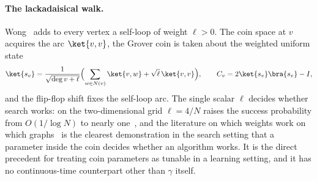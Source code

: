 \paragraph*{The lackadaisical walk.}
\label{sec:lackadaisical}
Wong~\cite{Wong_2015, G_2018} adds to every vertex a self-loop of weight $\ell
> 0$. The coin space at $v$ acquires the arc $\ket{v, v}$, the Grover coin is
taken about the weighted uniform state
\begin{equation}
	\ket{s_v} = \frac{1}{\sqrt{\deg v + \ell}} \Bigl( \sum_{w \in N(v)} \ket{v, w} + \sqrt{\ell}\, \ket{v, v} \Bigr), \qquad
	C_v = 2\ket{s_v}\bra{s_v} - I,
	\label{eq:lackadaisical}
\end{equation}
and the flip-flop shift fixes the self-loop arc. The single scalar $\ell$
decides whether search works: on the two-dimensional grid $\ell = 4/N$
raises the success probability from $O(1/\log N)$ to nearly
one~\cite{G_2018}, and the literature on which weights work on which
graphs~\cite{Giri_2020, Nahimovs_2018, Rhodes_2019, Rapoza_2021} is the
clearest demonstration in the search setting that a parameter inside the
coin decides whether an algorithm works. It is the direct precedent for
treating coin parameters as tunable in a learning setting, and it has no
continuous-time counterpart other than $\gamma$ itself.

